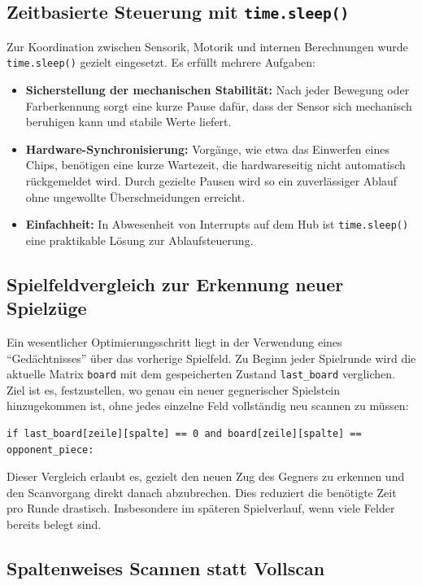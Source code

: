 \subsection{Zeitbasierte Steuerung mit \texttt{time.sleep()}}

Zur Koordination zwischen Sensorik, Motorik und internen Berechnungen wurde \texttt{time.sleep()} gezielt eingesetzt. Es erfüllt mehrere Aufgaben:

\begin{itemize}
	\item \textbf{Sicherstellung der mechanischen Stabilität:} Nach jeder Bewegung oder Farberkennung sorgt eine kurze Pause dafür, dass der Sensor sich mechanisch beruhigen kann und stabile Werte liefert.
	\item \textbf{Hardware-Synchronisierung:}  Vorgänge, wie etwa das Einwerfen eines Chips, benötigen eine kurze Wartezeit, die hardwareseitig nicht automatisch rückgemeldet wird. Durch gezielte Pausen wird so ein zuverlässiger Ablauf ohne ungewollte Überschneidungen erreicht.
	\item \textbf{Einfachheit:} In Abwesenheit von Interrupts auf dem Hub ist \texttt{time.sleep()} eine praktikable Lösung zur Ablaufsteuerung.
\end{itemize}

\subsection{Spielfeldvergleich zur Erkennung neuer Spielzüge}

Ein wesentlicher Optimierungsschritt liegt in der Verwendung eines ``Gedächtnisses'' über das vorherige Spielfeld. Zu Beginn jeder Spielrunde wird die aktuelle Matrix \texttt{board} mit dem gespeicherten Zustand \texttt{last\_board} verglichen. Ziel ist es, festzustellen, wo genau ein neuer gegnerischer Spielstein hinzugekommen ist, ohne jedes einzelne Feld vollständig neu scannen zu müssen:

\begin{lstlisting}[style=pythonstyle]
	if last_board[zeile][spalte] == 0 and board[zeile][spalte] == opponent_piece:
\end{lstlisting}

Dieser Vergleich erlaubt es, gezielt den neuen Zug des Gegners zu erkennen und den Scanvorgang direkt danach abzubrechen. Dies reduziert die benötigte Zeit pro Runde drastisch. Insbesondere im späteren Spielverlauf, wenn viele Felder bereits belegt sind.

\subsection{Spaltenweises Scannen statt Vollscan}

